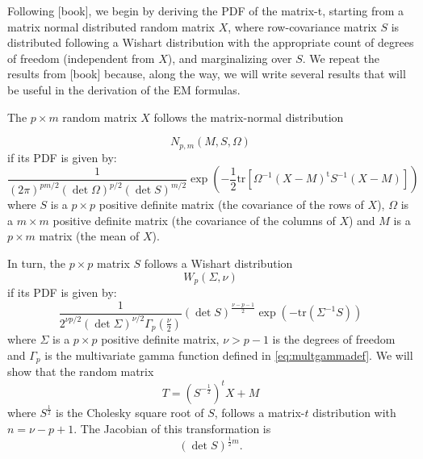\documentclass[english,listof=totoc]{scrartcl}
\begin{document}
Following {[}book{]}, we begin by deriving the PDF of the matrix-t,
starting from a matrix normal distributed random matrix $X$, where
row-covariance matrix $S$ is distributed following a Wishart distribution
with the appropriate count of degrees of freedom (independent from
$X$), and marginalizing over $S$. We repeat the results from {[}book{]}
because, along the way, we will write several results that will be
useful in the derivation of the EM formulas.

The $p\times m$ random matrix $X$ follows the matrix-normal distribution

\begin{equation}
N_{p,m}(M,S,\Omega)\label{eq:ndist}
\end{equation}
if its PDF is given by:
\begin{equation}
\frac{1}{(2\pi)^{pm/2}(\det\Omega)^{p/2}(\det S)^{m/2}}\exp\left(-\frac{1}{2}\textrm{tr}\left[\Omega^{-1}(X-M)^{\textrm{t}}S^{-1}(X-M)\right]\right)\label{eq:ndistpdf}
\end{equation}
where $S$ is a $p\times p$ positive definite matrix (the covariance
of the rows of $X$), $\Omega$ is a $m\times m$ positive definite
matrix (the covariance of the columns of $X$) and $M$ is a $p\times m$
matrix (the mean of $X$).

In turn, the $p\times p$ matrix $S$ follows a Wishart distribution
\begin{equation}
W_{p}\left(\Sigma,\nu\right)\label{eq:wdist}
\end{equation}
 if its PDF is given by:
\begin{equation}
\frac{1}{2^{\nu p/2}(\det\Sigma)^{\nu/2}\Gamma_{p}(\frac{\nu}{2})}(\det S)^{\frac{\nu-p-1}{2}}\exp\left(-\textrm{tr}(\Sigma^{-1}S)\right)\label{eq:wdistpdf}
\end{equation}
where $\Sigma$ is a $p\times p$ positive definite matrix, $\nu>p-1$
is the degrees of freedom and $\Gamma_{p}$ is the multivariate gamma
function defined in \ref{eq:multgammadef}. We will show that the
random matrix
\begin{equation}
T=(S^{-\frac{1}{2}})^{t}X+M\label{eq:change}
\end{equation}
where $S^{\frac{1}{2}}$ is the Cholesky square root of $S$, follows
a matrix-$t$ distribution with $n=\nu-p+1$. The Jacobian of this
transformation is 
\begin{equation}
(\det S)^{\frac{1}{2}m}.\label{eq:jac}
\end{equation}
\end{document}

